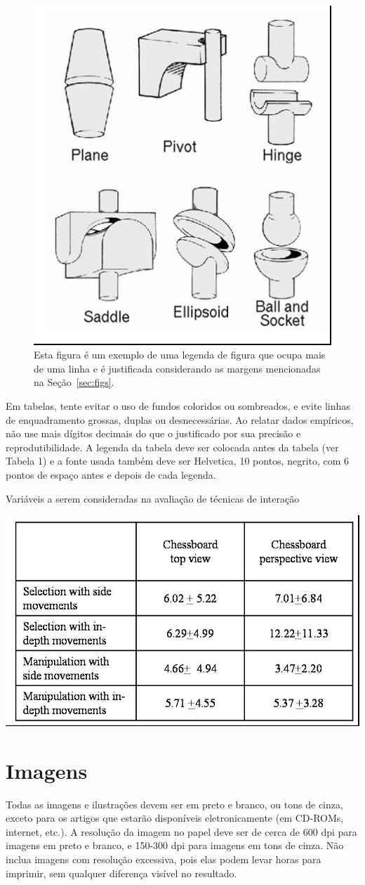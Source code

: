 \documentclass[12pt]{article}
\begin{document}
\begin{figure}[ht]
\centering
\includegraphics[width=.3\textwidth]{fig2.jpg}
\caption{Esta figura é um exemplo de uma legenda de figura que ocupa mais de uma
linha e é justificada considerando as margens mencionadas na Seção~\ref{sec:figs}.}
\label{fig:exampleFig2}
\end{figure}

Em tabelas, tente evitar o uso de fundos coloridos ou sombreados, e evite
linhas de enquadramento grossas, duplas ou desnecessárias. Ao relatar dados empíricos,
não use mais dígitos decimais do que o justificado por sua precisão e
reprodutibilidade. A legenda da tabela deve ser colocada antes da tabela (ver Tabela 1)
e a fonte usada também deve ser Helvetica, 10 pontos, negrito, com 6 pontos de
espaço antes e depois de cada legenda.

\begin{table}[ht]
\centering
\caption{Variáveis a serem consideradas na avaliação de técnicas de
interação}
\label{tab:exTable1}
\includegraphics[width=.7\textwidth]{table.jpg}
\end{table}

\section{Imagens}

Todas as imagens e ilustrações devem ser em preto e branco, ou tons de cinza,
exceto para os artigos que estarão disponíveis eletronicamente (em CD-ROMs,
internet, etc.). A resolução da imagem no papel deve ser de cerca de 600 dpi para
imagens em preto e branco, e 150-300 dpi para imagens em tons de cinza. Não inclua
imagens com resolução excessiva, pois elas podem levar horas para imprimir, sem qualquer
diferença visível no resultado.
\end{document}
